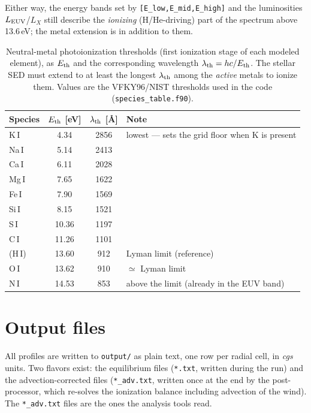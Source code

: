 \documentclass[english,a4paper]{kiseon_memo}
\begin{document}
\noindent Either way, the energy bands set by \texttt{[E\_low,E\_mid,E\_high]} and
the luminosities $L_{\rm EUV}$/$L_X$ still describe the \emph{ionizing}
(H/He-driving) part of the spectrum above 13.6\,eV; the metal extension is in
addition to them.

\begin{table}[htbp]\centering\small
\caption{Neutral-metal photoionization thresholds (first ionization stage of
each modeled element), as $E_{\rm th}$ and the corresponding wavelength
$\lambda_{\rm th}=hc/E_{\rm th}$. The stellar SED must extend to at least the
longest $\lambda_{\rm th}$ among the \emph{active} metals to ionize them. Values
are the VFKY96/NIST thresholds used in the code (\texttt{species\_table.f90}).}
\label{tab:metaledge}
\begin{tabular}{@{}lccl@{}}
\toprule
Species & $E_{\rm th}$ [eV] & $\lambda_{\rm th}$ [\AA] & Note \\
\midrule
K\,I  & 4.34  & 2856 & lowest --- sets the grid floor when K is present \\
Na\,I & 5.14  & 2413 & \\
Ca\,I & 6.11  & 2028 & \\
Mg\,I & 7.65  & 1622 & \\
Fe\,I & 7.90  & 1569 & \\
Si\,I & 8.15  & 1521 & \\
S\,I  & 10.36 & 1197 & \\
C\,I  & 11.26 & 1101 & \\
\midrule
(H\,I) & 13.60 & 912 & Lyman limit (reference) \\
O\,I  & 13.62 & 910 & $\simeq$ Lyman limit \\
N\,I  & 14.53 & 853 & above the limit (already in the EUV band) \\
\bottomrule
\end{tabular}
\end{table}

\section{Output files}\label{sec:outputs}
All profiles are written to \texttt{output/} as plain text, one row per radial
cell, in \emph{cgs} units. Two flavors exist: the equilibrium files
(\texttt{*.txt}, written during the run) and the advection-corrected files
(\texttt{*\_adv.txt}, written once at the end by the post-processor, which
re-solves the ionization balance including advection of the wind). The
\texttt{*\_adv.txt} files are the ones the analysis tools read.
\end{document}
